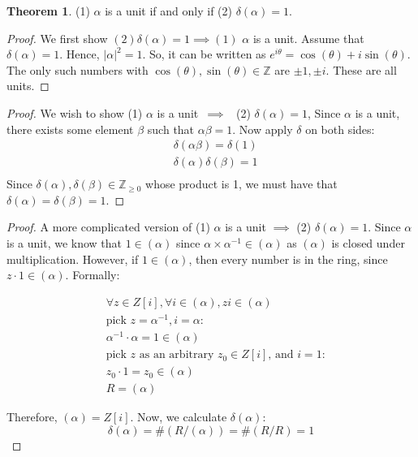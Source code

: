 \documentclass{book}
\newcommand{\Z}{\ensuremath{\mathbb{Z}}}
\theoremstyle{definition}
\newtheorem{theorem}{Theorem}
\begin{document}
\begin{theorem}
(1) $\alpha$ is a unit if and only if (2) $\delta(\alpha) = 1$.
\end{theorem}
\begin{proof}
We first show $(2) \delta(\alpha) = 1 \implies (1)$ $\alpha$ is a unit.
Assume that $\delta(\alpha) = 1$. Hence, $|\alpha|^2 = 1$.
So, it can be written as $e^{i \theta} = \cos(\theta) + i \sin(\theta)$. The only
such numbers with  $\cos(\theta), \sin(\theta) \in \Z$ are $\pm 1, \pm i$. 
These are all units. 
\end{proof}

\begin{proof}
We wish to show (1) $\alpha$ is a unit~$\implies$~ (2) $\delta (\alpha) = 1$, 
Since $\alpha$ is a unit, there exists some element $\beta$ such that $\alpha \beta = 1$.
Now apply $\delta$ on both sides:
\begin{align*}
&\delta(\alpha \beta) = \delta(1) \\
&\delta(\alpha) \delta(\beta) = 1 \\
\end{align*}
Since $\delta(\alpha), \delta(\beta) \in \Z_{\geq 0}$ whose product is 1, we must have that
$\delta(\alpha) = \delta(\beta) = 1$. 
\end{proof}


\begin{proof}
A more complicated version of (1) $\alpha$ is a unit $\implies$ (2) $\delta (\alpha) = 1$.
Since $\alpha$ is a unit, we know that $1 \in (\alpha)$ since $\alpha \times \alpha^{-1} \in (\alpha)$
as $(\alpha)$ is closed under multiplication. However, if $1 \in (\alpha)$,
then every number is in the ring, since $z \cdot 1 \in (\alpha)$. Formally:

\begin{align*}
&\forall z \in Z[i], \forall i \in (\alpha), zi \in (\alpha) \\
&\text{pick $z = \alpha^{-1}, i = \alpha$:} \\
&\alpha^{-1} \cdot \alpha = 1 \in (\alpha) \\
&\text{pick $z$ as an arbitrary $z_0 \in Z[i]$, and $i = 1$:} \\
&z_0 \cdot 1 =  z_0 \in (\alpha) \\
&R = (\alpha)
\end{align*}

Therefore, $(\alpha) = Z[i]$. Now, we calculate $\delta(\alpha)$:
$$\delta(\alpha) = \#(R/(\alpha)) = \#(R/R) = 1$$
\end{proof}
\end{document}

